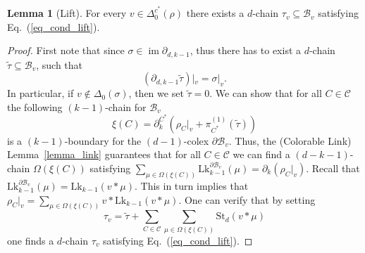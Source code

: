\documentclass[onecolumn,letterpaper,11pt,accepted=2022-12-19]{quantumarticle}
\newcommand{\face}[2]{{\Delta_{#1}(#2)}}
\newcommand{\facex}[3]{{\Delta^{#1}_{#2}(#3)}}
\newcommand{\link}[2]{{\mathrm{Lk}_{#1}(#2)}}
\newcommand{\linkx}[3]{{\mathrm{Lk}^{#1}_{#2}(#3)}}
\renewcommand{\star}[2]{{\mathrm{St}_{#1}(#2)}}
\DeclareMathOperator{\im}{im}
\newcommand{\bnd}[2]{\partial_{#1,#2}}
\newcommand{\rest}[1]{|_{#1}}
\theoremstyle{definition}
\newtheorem{lemma}{Lemma}
\theoremstyle{lemma}
\theoremstyle{theorem}
\theoremstyle{corollary}
\begin{document}
{\begin{lemma}[Lift]
\label{lemma_lift}
For every $v\in \facex {c^*} 0 \rho$ there exists a $d$-chain $\tau_v \subseteq \mathcal{B}_v$ satisfying Eq.~(\ref{eq_cond_lift}).
\end{lemma}

\begin{proof}
First note that since $\sigma\in\im\bnd {d} {k-1}$, thus there has to exist a $d$-chain $\widetilde\tau\subseteq\mathcal{B}_v$, such that
\begin{equation}
\label{eq_sometau}
(\bnd d {k-1} \widetilde\tau)\rest v = \sigma\rest v.
\end{equation}
In particular, if $v\not\in\face 0 \sigma$, then we set $\widetilde\tau = 0$.
We can show that for all $C\in\mathcal{C}$ the following $(k-1)$-chain for $\mathcal{B}_v$
\begin{equation}
\xi(C) = \partial_k^{C^*}\left(\rho_C\rest v + \pi^{(1)}_{C^*}(\widetilde\tau)\right)
\end{equation}
is a $(k-1)$-boundary for the $(d-1)$-colex $\partial\mathcal{B}_v$.
Thus, the (Colorable Link) Lemma~\ref{lemma_link} guarantees that for all $C\in\mathcal{C}$ we can find a $(d-k-1)$-chain $\Omega(\xi(C))$ satisfying $\sum_{\mu\in\Omega(\xi(C))} \linkx {\partial\mathcal{B}_v} {k-1} \mu = \partial_k(\rho_C\rest v)$.
Recall that 
$\linkx {\partial\mathcal{B}_v} {k-1} \mu = \link {k-1} {v * \mu}$.
This in turn implies that $\rho_C\rest v = \sum_{\mu\in\Omega(\xi(C))} v*\link {k-1} {v*\mu}$.
One can verify that by setting
\begin{equation}
\tau_v = \widetilde\tau + \sum_{C\in\mathcal{C}} \sum_{\mu\in\Omega(\xi(C))} \star d {v*\mu}
\end{equation}
one finds a $d$-chain $\tau_v$ satisfying Eq.~(\ref{eq_cond_lift}).



\end{proof}}
\end{document}

